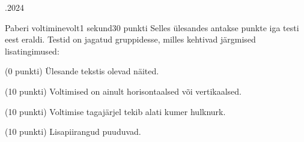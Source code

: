 \documentclass[a4paper,11pt]{article}
\begin{document}
\begin{ol}{\eio}{.2024}{\yle}{}
\begin{yl}{3}{Paberi voltimine}{volt}{1 sekund}{30 punkti}
\hnd Selles ülesandes antakse punkte iga testi eest eraldi. Testid on jagatud gruppidesse, milles kehtivad järgmised lisatingimused:
\begin{xenum}
	\item (0 punkti) Ülesande tekstis olevad näited.
	\item (10 punkti) Voltimised on ainult horisontaalsed või vertikaalsed.
	\item (10 punkti) Voltimise tagajärjel tekib alati kumer hulknurk.
	\item (10 punkti) Lisapiirangud puuduvad.
\end{xenum}

\end{yl}
\end{ol}
\end{document}
